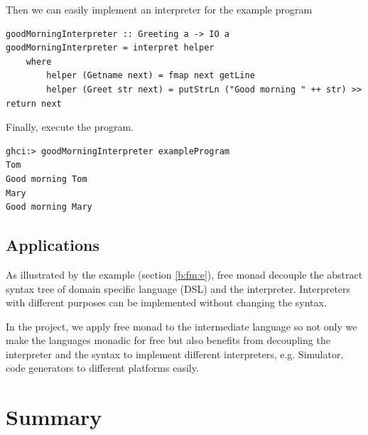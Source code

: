 Then we can easily implement an interpreter for the example program
\begin{verbatim}
goodMorningInterpreter :: Greeting a -> IO a
goodMorningInterpreter = interpret helper
    where
        helper (Getname next) = fmap next getLine
        helper (Greet str next) = putStrLn ("Good morning " ++ str) >> return next  
\end{verbatim} 
Finally, execute the program.
\begin{verbatim}
ghci:> goodMorningInterpreter exampleProgram
Tom
Good morning Tom
Mary
Good morning Mary
\end{verbatim}

\subsection{Applications} \label{b:fm:a}
As illustrated by the example (section \ref{b:fm:e}), free monad decouple the abstract syntax tree of domain specific language (DSL) and the interpreter. Interpreters with different purposes can be implemented without changing the syntax.

In the project, we apply free monad to the intermediate language so not only we make the languages monadic for free but also benefits from decoupling the interpreter and the syntax to implement different interpreters, e.g. Simulator, code generators to different platforms easily.
\section{Summary}